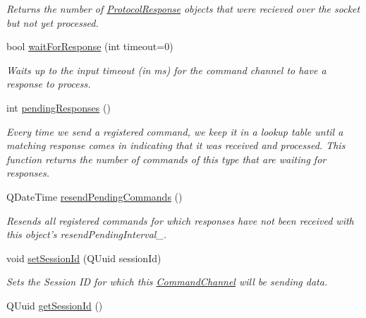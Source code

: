\begin{DoxyCompactItemize}
\begin{DoxyCompactList}\small\item\em Returns the number of \hyperlink{struct_picto_1_1_protocol_response}{Protocol\-Response} objects that were recieved over the socket but not yet processed. \end{DoxyCompactList}\item 
bool \hyperlink{class_picto_1_1_command_channel_adc000fefa9fa963e93aff6e067bca69c}{wait\-For\-Response} (int timeout=0)
\begin{DoxyCompactList}\small\item\em Waits up to the input timeout (in ms) for the command channel to have a response to process. \end{DoxyCompactList}\item 
\hypertarget{class_picto_1_1_command_channel_a995ed26dfa4a7c97b2961279aec5f821}{int \hyperlink{class_picto_1_1_command_channel_a995ed26dfa4a7c97b2961279aec5f821}{pending\-Responses} ()}\label{class_picto_1_1_command_channel_a995ed26dfa4a7c97b2961279aec5f821}

\begin{DoxyCompactList}\small\item\em Every time we send a registered command, we keep it in a lookup table until a matching response comes in indicating that it was received and processed. This function returns the number of commands of this type that are waiting for responses. \end{DoxyCompactList}\item 
Q\-Date\-Time \hyperlink{class_picto_1_1_command_channel_a3231cb5461098aea05caea3755901d28}{resend\-Pending\-Commands} ()
\begin{DoxyCompactList}\small\item\em Resends all registered commands for which responses have not been received with this object's resend\-Pending\-Interval\-\_\-. \end{DoxyCompactList}\item 
void \hyperlink{class_picto_1_1_command_channel_ab5523a5b477f21ba2c88160e67ff7a8b}{set\-Session\-Id} (Q\-Uuid session\-Id)
\begin{DoxyCompactList}\small\item\em Sets the Session I\-D for which this \hyperlink{class_picto_1_1_command_channel}{Command\-Channel} will be sending data. \end{DoxyCompactList}\item 
\hypertarget{class_picto_1_1_command_channel_a146335a81b0ef524aa8291b3f6dc9721}{Q\-Uuid \hyperlink{class_picto_1_1_command_channel_a146335a81b0ef524aa8291b3f6dc9721}{get\-Session\-Id} ()}\label{class_picto_1_1_command_channel_a146335a81b0ef524aa8291b3f6dc9721}


\end{DoxyCompactItemize}
